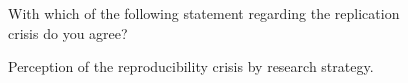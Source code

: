 \documentclass[
  letterpaper,
]{article}
\begin{document}
\begin{figure}


\caption{\label{fig-dona}With which of the following statement regarding
the replication crisis do you agree?}

\end{figure}%

\begin{figure}


\caption{\label{fig-dona-grid}Perception of the reproducibility crisis
by research strategy.}

\end{figure}%
\end{document}
